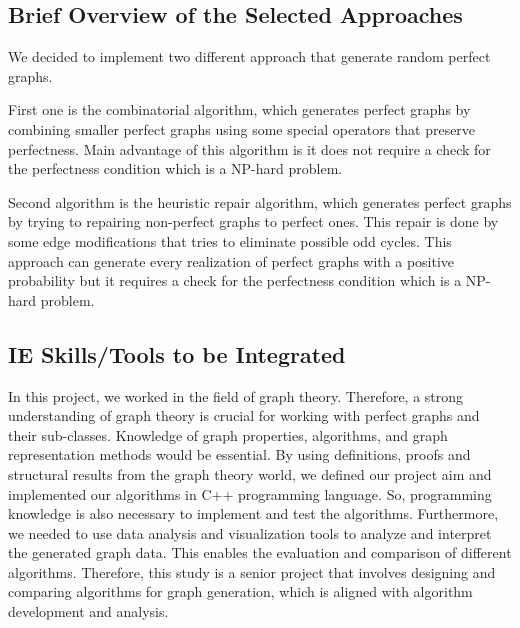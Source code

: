 \subsection{Brief Overview of the Selected Approaches}
We decided to implement two different approach that generate random perfect graphs. 

First one is the combinatorial  algorithm, which generates perfect graphs by combining smaller perfect graphs using some special operators that preserve perfectness. Main advantage of this algorithm is it does not require a check for the perfectness condition which is a NP-hard problem.

Second algorithm is the heuristic repair algorithm, which generates perfect graphs by trying to repairing non-perfect graphs to perfect ones. This repair is done by some edge modifications that tries to eliminate possible odd cycles. This approach can generate every realization of perfect graphs with a positive probability but it requires a check for the perfectness condition which is a NP-hard problem.

\subsection{IE Skills/Tools to be Integrated}

In this project, we worked in the field of graph theory. Therefore, a strong understanding of graph theory is crucial for working with perfect graphs and their sub-classes. Knowledge of graph properties, algorithms, and graph representation methods would be essential. By using definitions, proofs and structural results from the graph theory world, we defined our project aim and implemented our algorithms in C++ programming language. So, programming knowledge is also necessary to implement and test the algorithms. Furthermore, we needed to use data analysis and visualization tools to analyze and interpret the generated graph data. This enables the evaluation and comparison of different algorithms. Therefore, this study is a senior project that involves designing and comparing algorithms for graph generation, which is aligned with algorithm development and analysis. 